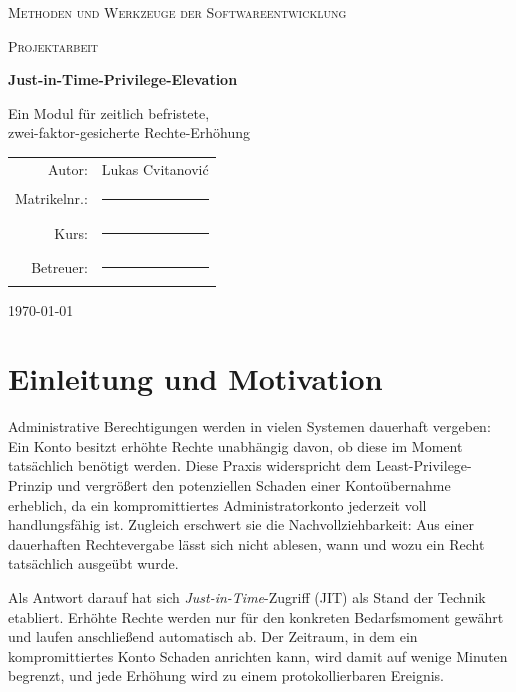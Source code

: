 \documentclass[11pt,a4paper]{article}
\begin{document}
\begin{titlepage}
  \centering
  {\scshape\large Methoden und Werkzeuge der Softwareentwicklung\par}
  \vspace{0.5cm}
  {\scshape Projektarbeit\par}
  \vfill
  {\Huge\bfseries Just-in-Time-Privilege-Elevation\par}
  \vspace{0.8cm}
  {\Large Ein Modul für zeitlich befristete,\\[0.2em]
   zwei-faktor-gesicherte Rechte-Erhöhung\par}
  \vfill
  \begin{tabular}{rl}
    Autor:        & Lukas Cvitanović \\        %
    Matrikelnr.:  & \rule{4cm}{0.4pt} \\        %
    Kurs:         & \rule{4cm}{0.4pt} \\        %
    Betreuer:     & \rule{4cm}{0.4pt} \\        %
  \end{tabular}
  \vspace{1.5cm}

  {\large \today\par}
\end{titlepage}

\tableofcontents
\clearpage

\section{Einleitung und Motivation}

Administrative Berechtigungen werden in vielen Systemen dauerhaft vergeben:
Ein Konto besitzt erhöhte Rechte unabhängig davon, ob diese im Moment
tatsächlich benötigt werden. Diese Praxis widerspricht dem
Least-Privilege-Prinzip und vergrößert den potenziellen Schaden einer
Kontoübernahme erheblich, da ein kompromittiertes Administratorkonto jederzeit
voll handlungsfähig ist. Zugleich erschwert sie die Nachvollziehbarkeit: Aus
einer dauerhaften Rechtevergabe lässt sich nicht ablesen, wann und wozu ein
Recht tatsächlich ausgeübt wurde.

Als Antwort darauf hat sich \emph{Just-in-Time}-Zugriff (JIT) als Stand der
Technik etabliert. Erhöhte Rechte werden nur für den konkreten Bedarfsmoment
gewährt und laufen anschließend automatisch ab. Der Zeitraum, in dem ein
kompromittiertes Konto Schaden anrichten kann, wird damit auf wenige Minuten
begrenzt, und jede Erhöhung wird zu einem protokollierbaren Ereignis.
\end{document}
